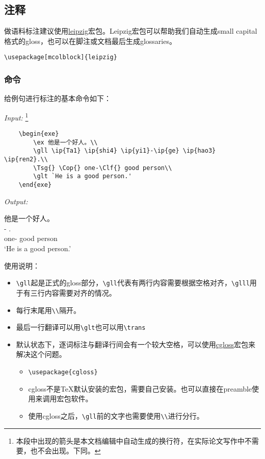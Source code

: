 \documentclass[a4paper,12pt]{article}
\begin{document}
\subsection{注释}

做语料标注建议使用\href{https://www.ctan.org/pkg/leipzig}{leipzig}宏包。Leipzig宏包可以帮助我们自动生成small capital格式的gloss，也可以在脚注或文档最后生成glossaries。

\verb|\usepackage[mcolblock]{leipzig}|

\subsubsection{命令}

给例句进行标注的基本命令如下：

\vspace{3mm}
\textit{Input:} \footnote{本段中出现的箭头是本文档编辑中自动生成的换行符，在实际论文写作中不需要，也不会出现。下同。}
\begin{Verbatim}
	\begin{exe}
		\ex 他是一个好人。\\
		\gll \ip{Ta1} \ip{shi4} \ip{yi1}-\ip{ge} \ip{hao3} \ip{ren2}.\\
		\Tsg{} \Cop{} one-\Clf{} good person\\
		\glt `He is a good person.'
	\end{exe}
\end{Verbatim}

\vspace{3mm}
\textit{Output:}
\begin{exe}
	\ex 他是一个好人。\\
	\gll {}  -  .\\
	\Tsg{} \Cop{} one-\Clf{} good person\\
	\glt `He is a good person.'
\end{exe}

\vspace{3mm}
使用说明：

\begin{itemize}
	\item \verb|\gll|起是正式的gloss部分，\verb|\gll|代表有两行内容需要根据空格对齐，\verb|\glll|用于有三行内容需要对齐的情况。
	\item 每行末尾用\verb|\\|隔开。
	\item 最后一行翻译可以用\verb|\glt|也可以用\verb|\trans|
	\item 默认状态下，逐词标注与翻译行间会有一个较大空格，可以使用\href{https://github.com/langsci/guidelines/blob/master/latexguidelines/cgloss.sty}{cgloss}宏包来解决这个问题。
		\begin{itemize}
			\item \verb|\usepackage{cgloss}|
			\item cgloss不是TeX默认安装的宏包，需要自己安装。也可以直接在preamble使用\verb||来调用宏包软件。
			\item 使用cgloss之后，\verb|\gll|前的文字也需要使用\verb|\\|进行分行。
		\end{itemize}
\end{itemize}
\end{document}
